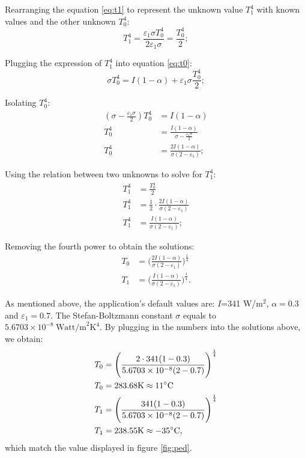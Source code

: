 \documentclass[a4paper,12pt]{article}
\begin{document}
Rearranging the equation \ref{eq:t1} to represent the unknown value $T_1^4$ with known values and the other unknown $T_0^4$:
    $$T_1^4 = \frac{\varepsilon_1\sigma T_0^4}{2\varepsilon_1\sigma}=\frac{T_0^4}{2};$$
    
Plugging the expression of $T_1^4$ into equation \ref{eq:t0}:
    $$\sigma T_0^4  = I(1-\alpha)+\varepsilon_1\sigma \frac{T_0^4}{2};$$
    
Isolating $T_0^4$:
    \begin{align*}
    (\sigma-\frac{\varepsilon_1\sigma}{2})T_0^4&=I(1-\alpha)\\
    T_0^4&=\frac{I(1-\alpha)}{\sigma-\frac{\varepsilon_1\sigma}{2}}\\
    T_0^4&=\frac{2I(1-\alpha)}{\sigma(2-\varepsilon_1)};
    \end{align*}
    
Using the relation between two unknowns to solve for $T_1^4$:
    \begin{align*}
        T_1^4&=\frac{T_0^4}{2}\\
        T_1^4&=\frac{1}{2}\cdot \frac{2I(1-\alpha)}{\sigma(2-\varepsilon_1)}\\
        T_1^4&=\frac{I(1-\alpha)}{\sigma(2-\varepsilon_1)};
    \end{align*}
    
Removing the fourth power to obtain the solutions:
    \begin{align*}
    T_0 &= \Bigg(\frac{2I(1-\alpha)}{\sigma(2-\varepsilon_1)}\Bigg)^{\frac{1}{4}}\\
    T_1 &= \Bigg(\frac{I(1-\alpha)}{\sigma(2-\varepsilon_1)}\Bigg)^{\frac{1}{4}}.
    \end{align*}

As mentioned above, the application's default values are: $I$=341 W/m$^2$, $\alpha=0.3$ and $\varepsilon_1=0.7$. The Stefan-Boltzmann constant $\sigma$ equals to $5.6703 \times 10^{-8}\  \text{Watt/m}^2 \text{K}^4$. By plugging in the numbers into the solutions above, we obtain:
\begin{align*}
    T_0 &= \Bigg(\frac{2\cdot 341(1-0.3)}{5.6703 \times 10^{-8}(2-0.7)}\Bigg)^{\frac{1}{4}}\\
    T_0 &= 283.68 \text{K} \approx 11\degree\text{C}\\
    T_1 &= \Bigg(\frac{341(1-0.3)}{5.6703 \times 10^{-8}(2-0.7)}\Bigg)^{\frac{1}{4}}\\
    T_1 &= 238.55 \text{K} \approx -35\degree\text{C,}\\
\end{align*}
which match the value displayed in figure \ref{fig:ped}.
\end{document}
